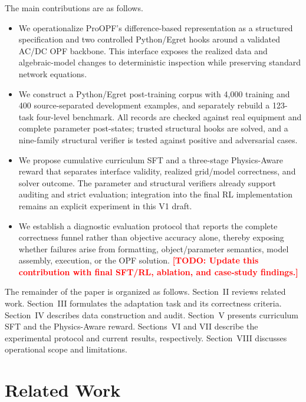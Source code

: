 \documentclass[lettersize,journal]{IEEEtran}
\newcommand{\drafttodo}[1]{\textcolor{red}{\textbf{[TODO: #1]}}}
\begin{document}
The main contributions are as follows.
\begin{itemize}
  \item We operationalize ProOPF's difference-based representation as a structured specification and two controlled Python/Egret hooks around a validated AC/DC OPF backbone. This interface exposes the realized data and algebraic-model changes to deterministic inspection while preserving standard network equations.
  \item We construct a Python/Egret post-training corpus with 4,000 training and 400 source-separated development examples, and separately rebuild a 123-task four-level benchmark. All records are checked against real equipment and complete parameter post-states; trusted structural hooks are solved, and a nine-family structural verifier is tested against positive and adversarial cases.
  \item We propose cumulative curriculum SFT and a three-stage Physics-Aware reward that separates interface validity, realized grid/model correctness, and solver outcome. The parameter and structural verifiers already support auditing and strict evaluation; integration into the final RL implementation remains an explicit experiment in this V1 draft.
  \item We establish a diagnostic evaluation protocol that reports the complete correctness funnel rather than objective accuracy alone, thereby exposing whether failures arise from formatting, object/parameter semantics, model assembly, execution, or the OPF solution. \drafttodo{Update this contribution with final SFT/RL, ablation, and case-study findings.}
\end{itemize}

The remainder of the paper is organized as follows. Section~II reviews related work. Section~III formulates the adaptation task and its correctness criteria. Section~IV describes data construction and audit. Section~V presents curriculum SFT and the Physics-Aware reward. Sections~VI and VII describe the experimental protocol and current results, respectively. Section~VIII discusses operational scope and limitations.

\section{Related Work}
\end{document}
